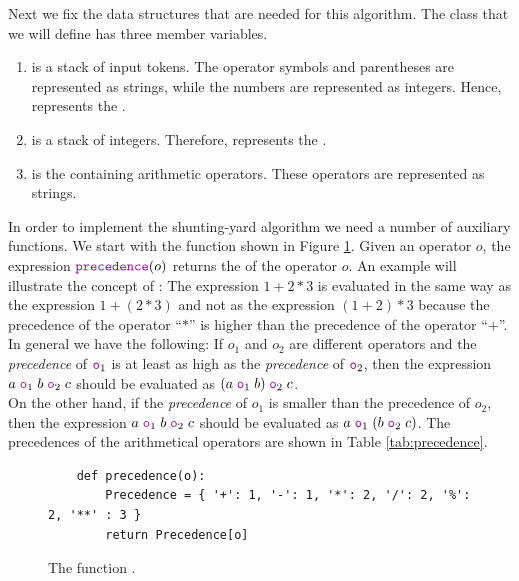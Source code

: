 Next we fix the data structures that are needed for this algorithm.  The class that we will define has three
member variables.
\begin{enumerate}
\item {} is a stack of input tokens.  The operator symbols and parentheses are
      represented as strings, while the numbers are represented as integers.  Hence, 
      represents the .
\item {} is a stack of integers.  Therefore,  represents the
      .
\item {} is the  containing arithmetic operators.  These operators
      are represented as strings.
\end{enumerate}
In order to implement the shunting-yard algorithm we need a number of auxiliary functions.
We start with the function  shown in Figure \ref{fig:precedence}.
Given an operator $o$, the expression $\mytt{precedence}(o)$ returns the  of the operator
$o$.  An example will illustrate the concept of :  The expression $1 + 2 * 3$
is evaluated in the same way as the expression $1 + (2*3)$ and not as the expression $(1+2)*3$ because the
precedence of the operator ``$*$'' is higher than the precedence of the operator ``$+$''.
In general we have the following:
If $o_1$ and $o_2$ are different operators and the \emph{precedence} of $\mytt{o}_1$ is at least as high as the 
\emph{precedence} of $\mytt{o}_2$, then the expression
\\[0.2cm]
\hspace*{1.3cm}
$a \;\mytt{o}_1\; b \;\mytt{o}_2\; c$ \quad should be evaluated as \quad
$(a \;\mytt{o}_1\; b) \;\mytt{o}_2\; c$.
\\[0.2cm]
On the other hand, if the \emph{precedence} of $o_1$ is smaller than the precedence of $o_2$, then the
expression $a \;\mytt{o}_1\; b \;\mytt{o}_2\; c$ should be evaluated as  $a \;\mytt{o}_1\; (b
\;\mytt{o}_2\; c)$.  
The precedences of the arithmetical operators are shown in Table \ref{tab:precedence}.

\begin{figure}[!ht]
\centering
\begin{verbatim}
    def precedence(o):
        Precedence = { '+': 1, '-': 1, '*': 2, '/': 2, '%': 2, '**' : 3 }
        return Precedence[o]
\end{verbatim}
\vspace*{-0.3cm}
\caption{The function .}
\label{fig:precedence}
\end{figure}


